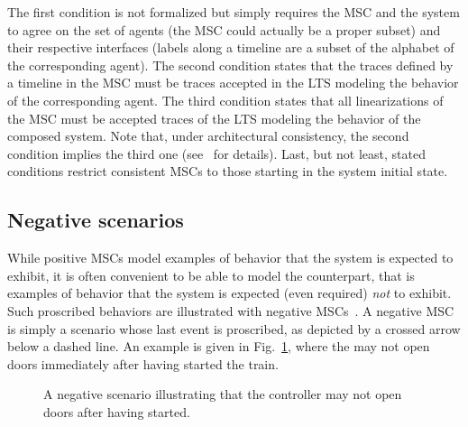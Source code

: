 The first condition is not formalized but simply requires the MSC and the system to agree on the set of agents (the MSC could actually be a proper subset) and their respective interfaces (labels along a timeline are a subset of the alphabet of the corresponding agent). The second condition states that the traces defined by a timeline in the MSC must be traces accepted in the LTS modeling the behavior of the corresponding agent. The third condition states that all linearizations of the MSC must be accepted traces of the LTS modeling the behavior of the composed system. Note that, under architectural consistency, the second condition implies the third one (see~\cite{Uchitel:2003} for details). Last, but not least, stated conditions restrict consistent MSCs to those starting in the system initial state.

\subsection{Negative scenarios}

While positive MSCs model examples of behavior that the system is expected to exhibit, it is often convenient to be able to model the counterpart, that is examples of behavior that the system is expected (even required) \emph{not} to exhibit. Such proscribed behaviors are illustrated with negative MSCs~\cite{Uchitel:2004}. A negative MSC is simply a scenario whose last event is proscribed, as depicted by a crossed arrow below a dashed line. An example is given in Fig.~\ref{image:train-negative-scenario}, where the  may not open doors immediately after having started the train.

\vspace{0.4cm}
\begin{figure}\centering
{}
\caption{A negative scenario illustrating that the controller may not open doors after having started.\label{image:train-negative-scenario}}
\end{figure}

